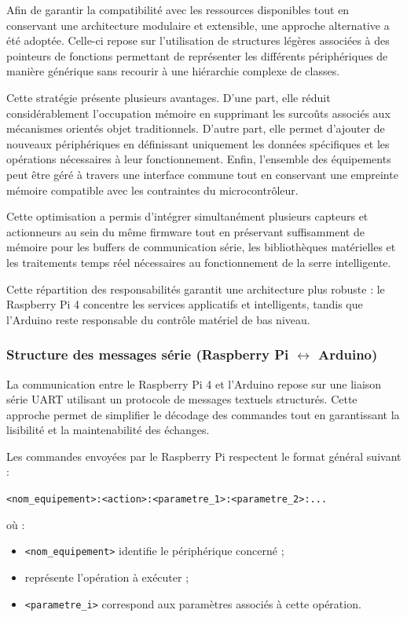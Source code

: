 Afin de garantir la compatibilité avec les ressources disponibles tout en conservant une architecture modulaire et extensible, une approche alternative a été adoptée. Celle-ci repose sur l'utilisation de structures légères associées à des pointeurs de fonctions permettant de représenter les différents périphériques de manière générique sans recourir à une hiérarchie complexe de classes.

Cette stratégie présente plusieurs avantages. D'une part, elle réduit considérablement l'occupation mémoire en supprimant les surcoûts associés aux mécanismes orientés objet traditionnels. D'autre part, elle permet d'ajouter de nouveaux périphériques en définissant uniquement les données spécifiques et les opérations nécessaires à leur fonctionnement. Enfin, l'ensemble des équipements peut être géré à travers une interface commune tout en conservant une empreinte mémoire compatible avec les contraintes du microcontrôleur.

Cette optimisation a permis d'intégrer simultanément plusieurs capteurs et actionneurs au sein du même firmware tout en préservant suffisamment de mémoire pour les buffers de communication série, les bibliothèques matérielles et les traitements temps réel nécessaires au fonctionnement de la serre intelligente.


Cette répartition des responsabilités garantit une architecture plus robuste : le Raspberry Pi 4 concentre les services applicatifs et intelligents, tandis que l'Arduino reste responsable du contrôle matériel de bas niveau.
\subsubsection*{Structure des messages série (Raspberry Pi \texorpdfstring{$\leftrightarrow$}{<->} Arduino)}
La communication entre le Raspberry Pi 4 et l'Arduino repose sur une liaison série UART utilisant un protocole de messages textuels structurés. Cette approche permet de simplifier le décodage des commandes tout en garantissant la lisibilité et la maintenabilité des échanges.

Les commandes envoyées par le Raspberry Pi respectent le format général suivant :


\texttt{<nom\_equipement>:<action>:<parametre\_1>:<parametre\_2>:...}


où :

\begin{itemize}
	\item \texttt{<nom\_equipement>} identifie le périphérique concerné ;
	\item \texttt{} représente l'opération à exécuter ;
	\item \texttt{<parametre\_i>} correspond aux paramètres associés à cette opération.
\end{itemize}

